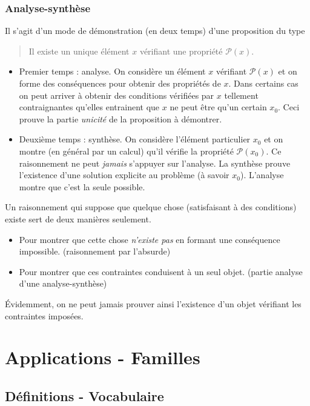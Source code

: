 \subsubsection{Analyse-synthèse}
 Il s'agit d'un mode de démonstration (en deux temps) d'une proposition du type
\begin{quote}
 Il existe un unique élément $x$ vérifiant une propriété $\mathcal P (x)$.
\end{quote}
\begin{itemize}
 \item Premier temps : analyse. On considère un élément $x$ vérifiant $\mathcal P (x)$ et on forme des conséquences pour obtenir des propriétés de $x$. Dans certains cas on peut arriver à obtenir des conditions vérifiées par $x$ tellement contraignantes qu'elles entrainent que $x$ ne peut être qu'un certain $x_0$. \newline
Ceci prouve la partie \emph{unicité} de la proposition à démontrer.
 \item Deuxième temps : synthèse. On considère l'élément particulier $x_0$ et on montre (en général par un calcul) qu'il vérifie la propriété $\mathcal P (x_0)$. Ce raisonnement ne peut \emph{jamais} s'appuyer sur l'analyse. La synthèse prouve l'existence d'une solution explicite au problème (à savoir $x_0$). L'analyse montre que c'est la seule possible.
\end{itemize}

Un raisonnement qui suppose que quelque chose (satisfaisant à des conditions) existe sert de deux manières seulement.
\begin{itemize}
 \item Pour montrer que cette chose \emph{n'existe pas} en formant une conséquence impossible.  (raisonnement par l'absurde)
 \item Pour montrer que ces contraintes conduisent à un seul objet. (partie analyse d'une analyse-synthèse)  
\end{itemize}
\'Evidemment, on ne peut jamais prouver ainsi l'existence d'un objet vérifiant les contraintes imposées.


\section{Applications - Familles}

\subsection{Définitions - Vocabulaire}

